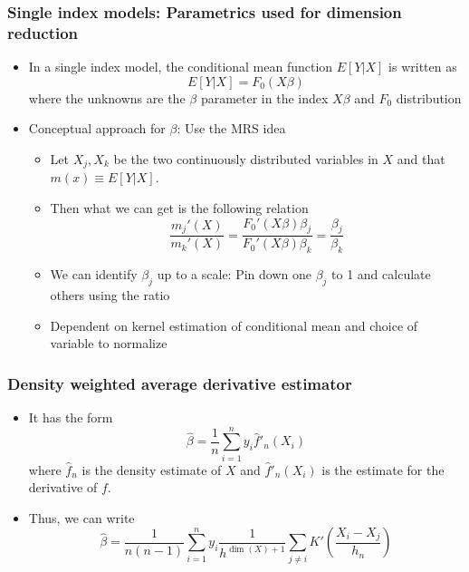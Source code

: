 \documentclass[aspectratio=169]{beamer}
\begin{document}
\begin{frame}
\frametitle{Single index models: Parametrics used for dimension reduction}
\begin{itemize}
\item In a single index model, the conditional mean function $E[Y|X]$ is written as
\[
E[Y|X]=F_0(X\beta)
\]
where the unknowns are the $\beta$ parameter in the index $X\beta$ and $F_0$ distribution
\item Conceptual approach for $\beta$: Use the MRS idea
\begin{itemize}
\item Let $X_j,X_k$ be the two continuously distributed variables in $X$ and that $m(x)\equiv E[Y|X]$.
\item Then what we can get is the following relation
\[
\frac{m_j'(X)}{m_k'(X)} = \frac{F_0'(X\beta)\beta_j}{F_0'(X\beta)\beta_k}=\frac{\beta_j}{\beta_k}
\]
\item We can identify $\beta_j$ up to a scale: Pin down one $\beta_j$ to 1 and calculate others using the ratio
\item Dependent on kernel estimation of conditional mean and choice of variable to normalize
\end{itemize}
\end{itemize}
\end{frame}

\begin{frame}
\frametitle{Density weighted average derivative estimator}
\begin{itemize}
\item It has the form
\[
\hat{\beta} = \frac{1}{n}\sum_{i=1}^n y_i\hat{f}'_n(X_i)
\]
where $\hat{f}_n$ is the density estimate of $X$ and $\hat{f}'_n(X_i)$ is the estimate for the derivative of $f$.
\item Thus, we can write 
\[
\hat{\beta} = \frac{1}{n(n-1)}\sum_{i=1}^n y_i\frac{1}{h^{\dim(X)+1}} \sum_{j\neq i}K'\left(\frac{X_i-X_j}{h_n}\right)
\]
\end{itemize}
\end{frame}
\end{document}
